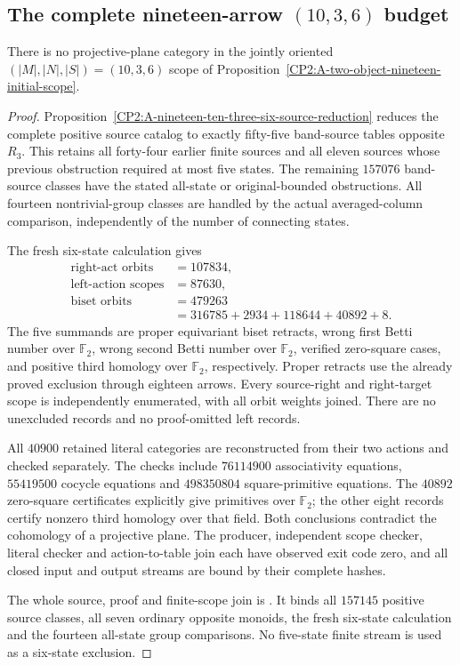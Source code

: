 \subsection{The complete nineteen-arrow $(10,3,6)$ budget}

\begin{theorem}
\label{CP2:A-oriented-nineteen-ten-three-six}
There is no projective-plane category in the jointly oriented
$(|M|,|N|,|S|)=(10,3,6)$ scope of
Proposition~\ref{CP2:A-two-object-nineteen-initial-scope}.
\end{theorem}
\begin{proof}
Proposition~\ref{CP2:A-nineteen-ten-three-six-source-reduction}
reduces the complete positive source catalog to exactly
fifty-five band-source tables opposite $R_3$.
This retains all forty-four earlier finite sources and all
eleven sources whose previous obstruction required at most
five states.  The remaining $157076$ band-source classes
have the stated all-state or original-bounded obstructions.
All fourteen nontrivial-group classes are handled by the
actual averaged-column comparison, independently of the
number of connecting states.

The fresh six-state calculation gives
\[
\begin{aligned}
 \text{right-act orbits}&=107834,\\
 \text{left-action scopes}&=87630,\\
 \text{biset orbits}&=479263\\
   &=316785+2934+118644+40892+8.
\end{aligned}
\]
The five summands are proper equivariant biset retracts,
wrong first Betti number over $\mathbb F_2$,
wrong second Betti number over $\mathbb F_2$,
verified zero-square cases, and positive third homology
over $\mathbb F_2$, respectively.  Proper retracts use the
already proved exclusion through eighteen arrows.
Every source-right and right-target scope is independently
enumerated, with all orbit weights joined.  There are no
unexcluded records and no proof-omitted left records.

All $40900$ retained literal categories are reconstructed
from their two actions and checked separately.
The checks include $76114900$ associativity equations,
$55419500$ cocycle equations and $498350804$ square-primitive
equations.  The $40892$ zero-square certificates explicitly
give primitives over $\mathbb F_2$; the other eight records
certify nonzero third homology over that field.
Both conclusions contradict the cohomology of a projective
plane.  The producer, independent scope checker, literal
checker and action-to-table join each have observed exit
code zero, and all closed input and output streams are bound
by their complete hashes.

The whole source, proof and finite-scope join is
.
It binds all $157145$ positive source classes, all seven
ordinary opposite monoids, the fresh six-state calculation
and the fourteen all-state group comparisons.
No five-state finite stream is used as a six-state exclusion.
\end{proof}


